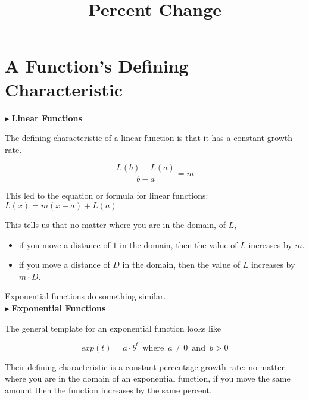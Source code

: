 \documentclass{ximera}
\title{Percent Change}
\begin{document}
\begin{abstract}
\end{abstract}
\maketitle




\section{A Function's Defining Characteristic}




$\blacktriangleright$ \textbf{\textcolor{blue!55!black}{Linear Functions}} 

The defining characteristic of a linear function is that it has a constant growth rate.


\[   \frac{L(b)-L(a)}{b-a} = m       \]

This led to the equation or formula for linear functions:  $L(x) = m(x-a) + L(a)$


This tells us that no matter where you are in the domain, of $L$, 



\begin{itemize}
\item if you move a distance of $1$ in the domain, then the value of $L$ increases by $m$. \\
\item if you move a distance of $D$ in the domain, then the value of $L$ increases by $m \cdot D$. \\
\end{itemize}

Exponential functions do something similar. \\





$\blacktriangleright$ \textbf{\textcolor{blue!55!black}{Exponential Functions}} 



The general template for an exponential function looks like 

\[   exp(t) = a \cdot b^t   \, \text{ where } \,  a \ne 0  \, \text{ and } \,    b > 0   \]



Their defining characteristic is a constant percentage growth rate: no matter where you are in the domain of an exponential function, if you move the same amount then the function increases by the same percent.
\end{document}

